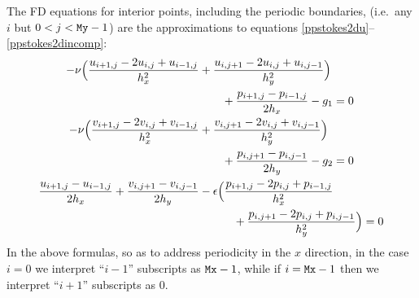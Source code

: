 The FD equations for interior points, including the periodic boundaries, (i.e.~any $i$ but $0 < j < \text{\texttt{My}}-1$) are the approximations to equations \eqref{ppstokes2du}--\eqref{ppstokes2dincomp}:
\begin{align}
-\nu \Big(\frac{u_{i+1,j} - 2 u_{i,j} + u_{i-1,j}}{h_x^2} &+ \frac{u_{i,j+1} - 2 u_{i,j} + u_{i,j-1}}{h_y^2}\Big) \notag \\
&\qquad + \frac{p_{i+1,j}-p_{i-1,j}}{2h_x} - g_1 = 0 \label{fdstokes2du} \\
-\nu \Big(\frac{v_{i+1,j} - 2 v_{i,j} + v_{i-1,j}}{h_x^2} &+ \frac{v_{i,j+1} - 2 v_{i,j} + v_{i,j-1}}{h_y^2}\Big) \notag \\
&\qquad + \frac{p_{i,j+1}-p_{i,j-1}}{2h_y} - g_2 = 0 \label{fdstokes2dv} \\
\frac{u_{i+1,j}-u_{i-1,j}}{2h_x} + \frac{v_{i,j+1}-v_{i,j-1}}{2h_y} &- \epsilon \Big(\frac{p_{i+1,j} - 2 p_{i,j} + p_{i-1,j}}{h_x^2} \notag \\
&\qquad\quad + \frac{p_{i,j+1} - 2 p_{i,j} + p_{i,j-1}}{h_y^2}\Big) = 0 \label{fdstokes2dincomp}
\end{align}
In the above formulas, so as to address periodicity in the $x$ direction, in the case $i=0$ we interpret ``$i-1$'' subscripts as $\text{\texttt{Mx}}-1$, while if $i=\text{\texttt{Mx}}-1$ then we interpret ``$i+1$'' subscripts as $0$.

